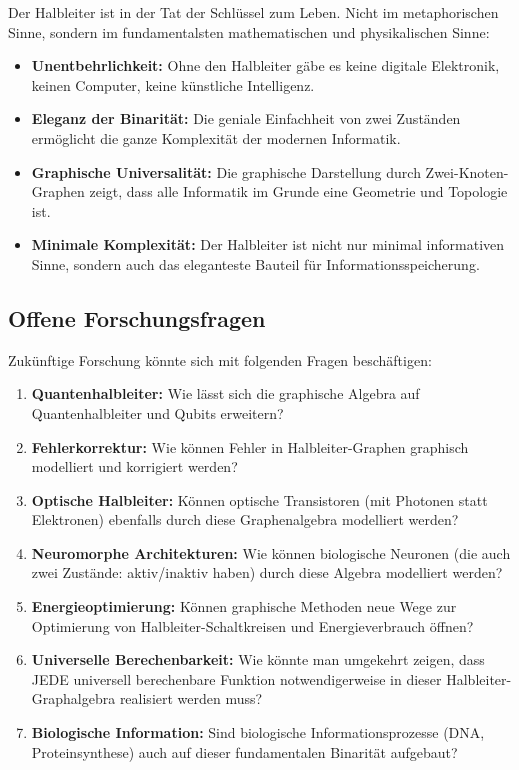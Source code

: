 \documentclass[12pt, a4paper]{article}
\theoremstyle{definition}
\theoremstyle{remark}
\begin{document}
Der Halbleiter ist in der Tat der Schlüssel zum Leben. Nicht im metaphorischen Sinne, sondern im fundamentalsten mathematischen und physikalischen Sinne:

\begin{itemize}
  \item \textbf{Unentbehrlichkeit:} Ohne den Halbleiter gäbe es keine digitale Elektronik, keinen Computer, keine künstliche Intelligenz.

  \item \textbf{Eleganz der Binarität:} Die geniale Einfachheit von zwei Zuständen ermöglicht die ganze Komplexität der modernen Informatik.

  \item \textbf{Graphische Universalität:} Die graphische Darstellung durch Zwei-Knoten-Graphen zeigt, dass alle Informatik im Grunde eine Geometrie und Topologie ist.

  \item \textbf{Minimale Komplexität:} Der Halbleiter ist nicht nur minimal informativen Sinne, sondern auch das eleganteste Bauteil für Informationsspeicherung.
\end{itemize}

\subsection{Offene Forschungsfragen}
\label{subsec:offene_fragen}

Zukünftige Forschung könnte sich mit folgenden Fragen beschäftigen:

\begin{enumerate}[label=(\alph*)]
  \item \textbf{Quantenhalbleiter:} Wie lässt sich die graphische Algebra auf Quantenhalbleiter und Qubits erweitern?

  \item \textbf{Fehlerkorrektur:} Wie können Fehler in Halbleiter-Graphen graphisch modelliert und korrigiert werden?

  \item \textbf{Optische Halbleiter:} Können optische Transistoren (mit Photonen statt Elektronen) ebenfalls durch diese Graphenalgebra modelliert werden?

  \item \textbf{Neuromorphe Architekturen:} Wie können biologische Neuronen (die auch zwei Zustände: aktiv/inaktiv haben) durch diese Algebra modelliert werden?

  \item \textbf{Energieoptimierung:} Können graphische Methoden neue Wege zur Optimierung von Halbleiter-Schaltkreisen und Energieverbrauch öffnen?

  \item \textbf{Universelle Berechenbarkeit:} Wie könnte man umgekehrt zeigen, dass JEDE universell berechenbare Funktion notwendigerweise in dieser Halbleiter-Graphalgebra realisiert werden muss?

  \item \textbf{Biologische Information:} Sind biologische Informationsprozesse (DNA, Proteinsynthese) auch auf dieser fundamentalen Binarität aufgebaut?
\end{enumerate}
\end{document}
